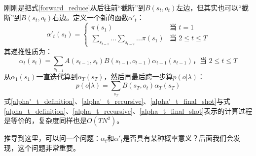 \documentclass[11pt,a4paper]{article}
\numberwithin{equation}{section}
\begin{document}
刚刚是把式\eqref{forward_reduce}从后往前“截断”到$B(s_t, o_t)$左边，但其实也可以“截断”到$B(s_t, o_t)$右边。定义一个新的函数$\alpha'_t$：
\begin{equation}\label{alpha'_t_definition}
\alpha'_t(s_t) = 
	\begin{cases}
		\pi(s_1) & \text{当 $t = 1$}\\
		\sum_{s_{t - 1}} ... \sum_{s_{t - 2}} ... \pi(s_1) & \text{当 $2 \le t \le T$}
	\end{cases}
\end{equation}
其递推性质为：
\begin{equation}\label{alpha'_t_recursive}
\alpha_t(s_t) = \sum_{s_{t - 1}} A(s_{t - 1}, s_t) B(s_{t - 1}, o_{t - 1}) \alpha_{t - 1}(s_{t - 1}) \text{，当 $2 \le t \le T$}
\end{equation}
从$\alpha_1(s_1)$一直迭代算到$\alpha_T(s_T)$，然后再最后跨一步算$p(o | \lambda)$：
\begin{equation}\label{alpha'_t_final_shot}
p(o | \lambda) = \sum_{s_T} B(s_T, o_t) \alpha_T(s_T)
\end{equation}
式\eqref{alpha'_t_definition}、\eqref{alpha'_t_recursive}、\eqref{alpha'_t_final_shot}与式\eqref{alpha_t_definition}、\eqref{alpha_t_recursive}、\eqref{alpha_t_final_shot}表示的计算过程是等价的，复杂度同样也是$O(TN^2)$。

推导到这里，可以问一个问题：$\alpha_t$和$\alpha'_t$是否具有某种概率意义？后面我们会发现，这个问题非常重要。
\end{document}
